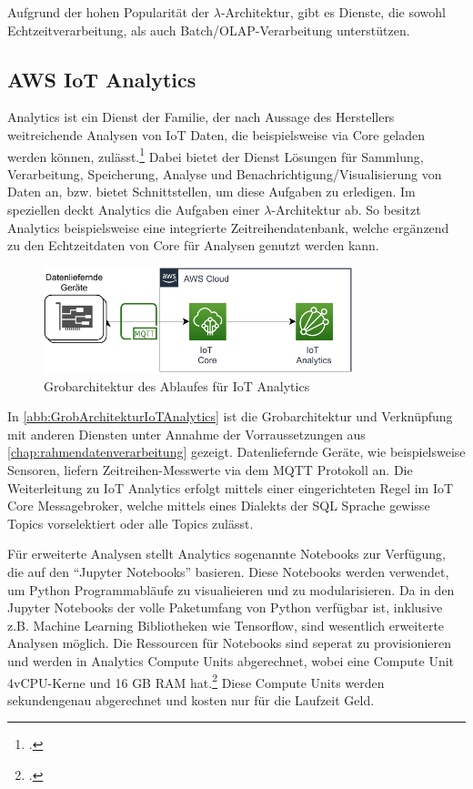 Aufgrund der hohen Popularität der $\lambda$-Architektur, gibt es Dienste, die sowohl Echtzeitverarbeitung, als auch Batch/\ac{OLAP}-Verarbeitung unterstützen.

\subsection{AWS IoT Analytics} \label{productselection:iotanalytics}



\AWSIOT{} Analytics ist ein Dienst der \AWSIOT{} Familie, der nach Aussage des Herstellers weitreichende Analysen von \ac{IoT} Daten, die beispielsweise via \AWSIOT{} Core geladen werden können, zulässt.\footcite[Vgl. auch im Folgenden][]{AmazonWebServicesInc..o.J.c} Dabei bietet der Dienst Lösungen für Sammlung, Verarbeitung, Speicherung, Analyse und Benachrichtigung/Visualisierung von Daten an, bzw. bietet Schnittstellen, um diese Aufgaben zu erledigen. Im speziellen deckt \AWSIOT{} Analytics die Aufgaben einer $\lambda$-Architektur ab. So besitzt \AWSIOT{} Analytics beispielsweise eine integrierte Zeitreihendatenbank, welche ergänzend zu den Echtzeitdaten von \AWSIOT{} Core für Analysen genutzt werden kann.
\begin{figure}[H]
\centering
\includegraphics[width=0.8\textwidth]{graphics/IoT-Analytics-general.pdf}
\caption{Grobarchitektur des Ablaufes für IoT Analytics}
\label{abb:GrobArchitekturIoTAnalytics}
\end{figure}
In \autoref{abb:GrobArchitekturIoTAnalytics} ist die Grobarchitektur und Verknüpfung mit anderen Diensten unter Annahme der Vorraussetzungen aus \autoref{chap:rahmendatenverarbeitung} gezeigt. Datenliefernde Geräte, wie beispielsweise Sensoren, liefern Zeitreihen-Messwerte via dem \ac{MQTT} Protokoll an. Die Weiterleitung zu IoT Analytics erfolgt mittels einer eingerichteten Regel im \ac{IoT} Core Messagebroker, welche mittels eines Dialekts der \ac{SQL} Sprache gewisse Topics vorselektiert oder alle Topics zulässt.


Für erweiterte Analysen stellt \AWSIOT{} Analytics sogenannte Notebooks zur Verfügung, die auf den \enquote{Jupyter Notebooks} basieren. Diese Notebooks werden verwendet, um Python Programmabläufe zu visualieieren und zu modularisieren. Da in den Jupyter Notebooks der volle Paketumfang von Python verfügbar ist, inklusive z.B. Machine Learning Bibliotheken wie Tensorflow, sind wesentlich erweiterte Analysen möglich. Die Ressourcen für Notebooks sind seperat zu provisionieren und werden in Analytics Compute Units abgerechnet, wobei eine Compute Unit 4vCPU-Kerne und 16 GB \ac{RAM} hat.\footcite[Vgl.][]{AmazonWebServicesInc..o.J.i} Diese Compute Units werden sekundengenau abgerechnet und kosten nur für die Laufzeit Geld.


